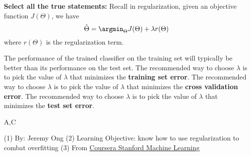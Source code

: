\begin{questions}
\question[] \textbf{Select all the true statements:}  Recall in regularization, given an objective function $J(\Theta)$, we have $$\hat{\Theta}=\argmin_{\Theta} J(\Theta) + \lambda r(\Theta)$$
where $r(\Theta)$ is the regularization term.
    {%
    \checkboxchar{$\Box$} %
    \begin{checkboxes}
     \choice The performance of the trained classifier on the training set will typically be better than its performance on the test set.
     \choice The recommended way to choose $\lambda$ is to pick the value of $\lambda$ that minimizes the \textbf{training set error}.
     \choice The recommended way to choose $\lambda$ is to pick the value of $\lambda$ that minimizes the \textbf{cross validation error}.
     \choice The recommended way to choose $\lambda$ is to pick the value of $\lambda$ that minimizes the \textbf{test set error}.
    \end{checkboxes}
    }
    \begin{soln}
    A,C\\
    \end{soln}
    \begin{qauthor}
    (1) By: Jeremy Ong (2) Learning Objective: know how to use regularization to combat overfitting (3) From \href{https://github.com/mGalarnyk/datasciencecoursera/blob/master/Stanford_Machine_Learning/Week6/AdviceQuiz.md}{\underline{Coursera Stanford Machine Learning}}
    \end{qauthor}

\end{questions}

